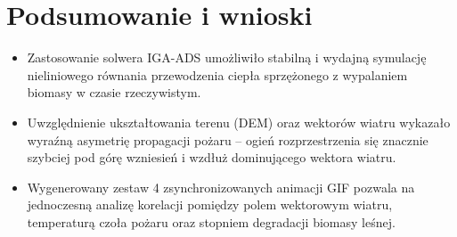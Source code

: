 \documentclass[11pt,a4paper]{article}
\begin{document}
\section{Podsumowanie i wnioski}
\begin{itemize}
    \item Zastosowanie solwera IGA-ADS umożliwiło stabilną i wydajną symulację nieliniowego równania przewodzenia ciepła sprzężonego z wypalaniem biomasy w czasie rzeczywistym.
    \item Uwzględnienie ukształtowania terenu (DEM) oraz wektorów wiatru wykazało wyraźną asymetrię propagacji pożaru -- ogień rozprzestrzenia się znacznie szybciej pod górę wzniesień i wzdłuż dominującego wektora wiatru.
    \item Wygenerowany zestaw 4 zsynchronizowanych animacji GIF pozwala na jednoczesną analizę korelacji pomiędzy polem wektorowym wiatru, temperaturą czoła pożaru oraz stopniem degradacji biomasy leśnej.
\end{itemize}
\end{document}
